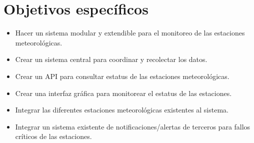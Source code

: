 \section{Objetivos específicos}

\begin{itemize}
   \item Hacer un sistema modular y extendible para el monitoreo de las estaciones meteorológicas.

   \item Crear un sistema central para coordinar y recolectar los datos.

   \item Crear un API para consultar estatus de las estaciones meteorológicas.

   \item Crear una interfaz gráfica para monitorear el estatus de las estaciones.

   \item Integrar las diferentes estaciones meteorológicas existentes al sistema.

   \item Integrar un sistema existente de notificaciones/alertas de terceros para fallos críticos de las estaciones.
\end{itemize}
